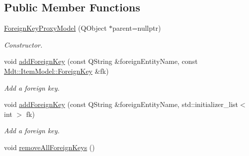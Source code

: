 \subsection*{Public Member Functions}
\begin{DoxyCompactItemize}
\item 
\hyperlink{class_mdt_1_1_item_model_1_1_foreign_key_proxy_model_a6bf3c68a0e8a02c7a6e6a58016caa345}{Foreign\+Key\+Proxy\+Model} (Q\+Object $\ast$parent=nullptr)\hypertarget{class_mdt_1_1_item_model_1_1_foreign_key_proxy_model_a6bf3c68a0e8a02c7a6e6a58016caa345}{}\label{class_mdt_1_1_item_model_1_1_foreign_key_proxy_model_a6bf3c68a0e8a02c7a6e6a58016caa345}

\begin{DoxyCompactList}\small\item\em Constructor. \end{DoxyCompactList}\item 
void \hyperlink{class_mdt_1_1_item_model_1_1_foreign_key_proxy_model_ac2d571d18a29f4a203620f501371ba4f}{add\+Foreign\+Key} (const Q\+String \&foreign\+Entity\+Name, const \hyperlink{class_mdt_1_1_item_model_1_1_foreign_key}{Mdt\+::\+Item\+Model\+::\+Foreign\+Key} \&fk)
\begin{DoxyCompactList}\small\item\em Add a foreign key. \end{DoxyCompactList}\item 
void \hyperlink{class_mdt_1_1_item_model_1_1_foreign_key_proxy_model_a6ce2783fc18a1091483e35c40d09affb}{add\+Foreign\+Key} (const Q\+String \&foreign\+Entity\+Name, std\+::initializer\+\_\+list$<$ int $>$ fk)
\begin{DoxyCompactList}\small\item\em Add a foreign key. \end{DoxyCompactList}\item 
void \hyperlink{class_mdt_1_1_item_model_1_1_foreign_key_proxy_model_abb391bc56f5c1cc2e8ead8e7db17c268}{remove\+All\+Foreign\+Keys} ()\hypertarget{class_mdt_1_1_item_model_1_1_foreign_key_proxy_model_abb391bc56f5c1cc2e8ead8e7db17c268}{}\label{class_mdt_1_1_item_model_1_1_foreign_key_proxy_model_abb391bc56f5c1cc2e8ead8e7db17c268}


\end{DoxyCompactItemize}

